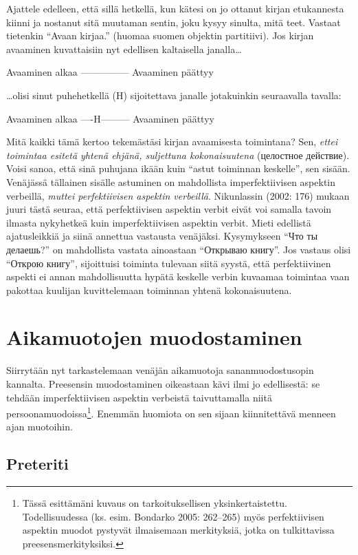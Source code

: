 \documentclass[]{scrreprt}
\begin{document}
Ajattele edelleen, että sillä hetkellä, kun kätesi on jo ottanut kirjan
etukannesta kiinni ja nostanut sitä muutaman sentin, joku kysyy sinulta,
mitä teet. Vastaat tietenkin ``Avaan kirjaa.'' (huomaa suomen objektin
partitiivi). Jos kirjan avaaminen kuvattaisiin nyt edellisen kaltaisella
janalla\ldots{}

Avaaminen alkaa \textbar{}---------------\textbar{} Avaaminen päättyy

\ldots{}olisi sinut puhehetkellä (H) sijoitettava janalle jotakuinkin
seuraavalla tavalla:

Avaaminen alkaa \textbar{}----H---------\textbar{} Avaaminen päättyy

Mitä kaikki tämä kertoo tekemästäsi kirjan avaamisesta toimintana? Sen,
\emph{ettei toimintaa esitetä yhtenä ehjänä, suljettuna kokonaisuutena}
(целостное действие). Voisi sanoa, että sinä puhujana ikään kuin ``astut
toiminnan keskelle'', sen sisään. Venäjässä tällainen sisälle astuminen
on mahdollista imperfektiivisen aspektin verbeillä, \emph{muttei
perfektiivisen aspektin verbeillä}. Nikunlassin (2002: 176) mukaan juuri
tästä seuraa, että perfektiivisen aspektin verbit eivät voi samalla
tavoin ilmasta nykyhetkeä kuin imperfektiivisen aspektin verbit. Mieti
edellistä ajatusleikkiä ja siinä annettua vastausta venäjäksi.
Kysymykseen ``Что ты делаешь?'' on mahdollista vastata ainoastaan
``Открываю книгу''. Jos vastaus olisi ``Открою книгу'', sijoittuisi
toiminta tulevaan siitä syystä, että perfektiivinen aspekti ei annan
mahdollisuutta hypätä keskelle verbin kuvaamaa toimintaa vaan pakottaa
kuulijan kuvittelemaan toiminnan yhtenä kokonaisuutena.

\section{Aikamuotojen
muodostaminen}\label{aikamuotojen-muodostaminen}

Siirrytään nyt tarkastelemaan venäjän aikamuotoja sananmuodostusopin
kannalta. Preesensin muodostaminen oikeastaan kävi ilmi jo edellisestä:
se tehdään imperfektiivisen aspektin verbeistä taivuttamalla niitä
persoonamuodoissa\footnote{Tässä esittämäni kuvaus on tarkoituksellisen
  yksinkertaistettu. Todellisuudessa (ks. esim. Bondarko 2005: 262--265)
  myös perfektiivisen aspektin muodot pystyvät ilmaisemaan merkityksiä,
  jotka on tulkittavissa preesensmerkityksiksi.}. Enemmän huomiota on
sen sijaan kiinnitettävä menneen ajan muotoihin.

\subsection{Preteriti}\label{preteriti}
\end{document}
